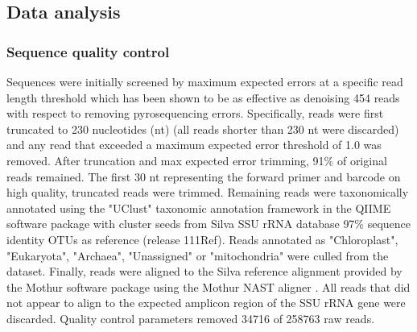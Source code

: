 \subsection{Data analysis} 
\subsubsection{Sequence quality control} Sequences were initially screened by
maximum expected errors at a specific read length threshold \citep{23955772}
which has been shown to be as effective as denoising 454 reads with respect to
removing pyrosequencing errors. Specifically, reads were first truncated to 230
nucleotides (nt) (all reads shorter than 230 nt were discarded) and any read that
exceeded a maximum expected error threshold of 1.0 was removed. After
truncation and max
expected error trimming, 91\% of original reads remained. The first 30 nt
representing the forward primer and barcode on high quality, truncated reads
were trimmed. Remaining reads were taxonomically annotated using the "UClust"
taxonomic annotation framework in the QIIME software package \citep{20383131,
20709691} with cluster seeds from Silva SSU rRNA database \citep{17947321} 97\%
sequence identity OTUs as reference (release 111Ref). Reads annotated as
"Chloroplast", "Eukaryota", "Archaea", "Unassigned" or "mitochondria" were
culled from the dataset. Finally, reads were aligned to the Silva reference
alignment provided by the Mothur software package \citep{19801464} using the
Mothur NAST aligner \citep{16845035}. All reads that did not appear to align to
the expected amplicon region of the SSU rRNA gene were discarded. Quality
control parameters removed 34716 of 258763 raw reads.

